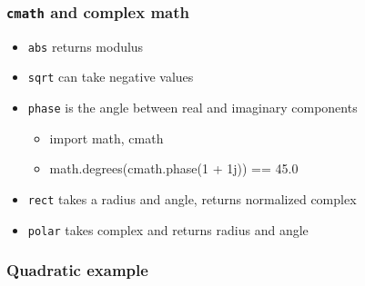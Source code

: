 \documentclass{beamer}
\begin{document}
\begin{frame}
  \frametitle{\texttt{cmath} and complex math}

  \begin{itemize}
    \item \texttt{abs} returns modulus
    \item \texttt{sqrt} can take negative values
    \item \texttt{phase} is the angle between real and imaginary components
      \begin{itemize}
        \item import math, cmath
	\item math.degrees(cmath.phase(1 + 1j)) == 45.0
      \end{itemize}
    \item \texttt{rect} takes a radius and angle, returns normalized complex
    \item \texttt{polar} takes complex and returns radius and angle
  \end{itemize}
\end{frame}

\begin{frame}
  \frametitle{Quadratic example}
\end{frame}

%
\end{document}
